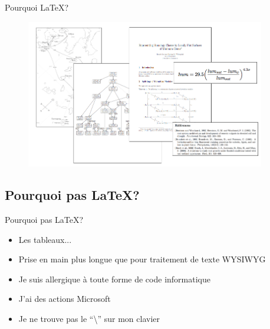 \documentclass[10pt,svgnames,usenames,table]{beamer} %
\begin{document}
\begin{frame}{Pourquoi \LaTeX{}?}

\begin{figure}[htbp]
\begin{center}
\includegraphics[height=6.5cm]{latex_exemples}
\end{center}
\end{figure}
\end{frame}

\subsection{Pourquoi pas \LaTeX{}?}
\begin{frame}{Pourquoi pas \LaTeX{}?}

  \begin{itemize}
  	\item Les tableaux...
	\item Prise en main plus longue que pour traitement de texte WYSIWYG
	\item Je suis allergique à toute forme de code informatique
	\item J'ai des actions Microsoft
	\item Je ne trouve pas le ``\textbackslash'' sur mon clavier
  \end{itemize}
\end{frame}
\end{document}
